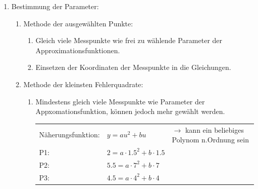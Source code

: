      	\begin{enumerate}[start=2]
        \item Bestimmung der Parameter:
          \begin{enumerate}
           \item Methode der ausgewählten Punkte:\\
          		\begin{enumerate}
                    \item Gleich viele Messpunkte wie frei zu wählende Parameter der
           			Approximationsfunktionen.
           			\item Einsetzen der Koordinaten der Messpunkte in die Gleichungen.
           		\end{enumerate}
           	\item Methode der kleinsten Fehlerquadrate:
           		\begin{enumerate}
								\item Mindestens gleich viele Messpunkte wie Parameter der
											Appxomationsfunktion, können jedoch mehr gewählt werden. \\
											\begin{tabular}{l l l}
												Näherungsfunktion: & $y = au^2 + bu$ & $\rightarrow$ kann ein beliebiges Polynom n.Ordnung sein\\
												P1:	& $2 = a\cdot 1.5^2+b\cdot 1.5$ & \\
												P2: & $5.5 = a\cdot 7^2+b\cdot 7$ &\\
												P3: & $4.5 = a\cdot 4^2+b\cdot 4$ &
											\end{tabular}
												

\end{enumerate}
\end{enumerate}
\end{enumerate}
